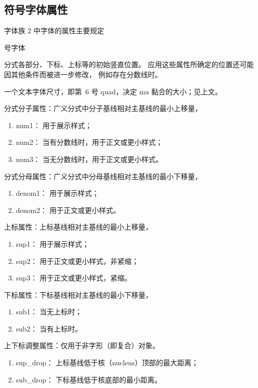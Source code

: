 \documentclass[a4paper]{rapport3}
\def\term#1\par{\index{#1}}
\begin{document}
\subsection{符号字体属性}

字体族 2 中字体的属性主要规定
\term 符号字体\par
分式各部分、下标、上标等的初始竖直位置。
应用这些属性所确定的位置还可能因其他条件而被进一步修改，
例如存在分数线时。

一个文本字体尺寸，即第~6 号 quad，决定 mu 黏合的大小；见上文。

分式分子属性：广义分式中分子基线相对主基线的最小上移量，
\begin{enumerate} %
\item num1：
 用于展示样式；
\item num2：
 当有分数线时，用于正文或更小样式；
\item num3：
 当无分数线时，用于正文或更小样式。
\end{enumerate}

分式分母属性：广义分式中分母基线相对主基线的最小下移量，
\begin{enumerate} %
\item denom1：
用于展示样式；
\item denom2：
用于正文或更小样式。
\end{enumerate}

上标属性：上标基线相对主基线的最小上移量，
\begin{enumerate} %
\item sup1：
用于展示样式；
\item sup2：
用于正文或更小样式，非紧缩；
\item sup3：
用于正文或更小样式，紧缩。
\end{enumerate}

下标属性：下标基线相对主基线的最小下移量，
\begin{enumerate} %
\item sub1：
当无上标时；
\item sub2：
当有上标时。
\end{enumerate}

上下标调整属性：仅用于非字形（即复合）对象。
\begin{enumerate} %
\item sup\_drop：
上标基线低于核（nucleus）顶部的最大距离；
\item sub\_drop：
下标基线低于核底部的最小距离。
\end{enumerate}
\end{document}
